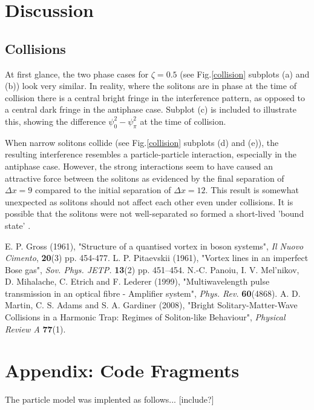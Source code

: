 \documentclass[10pt, twocolumn]{revtex4}    %
\begin{document}

\section{Discussion} 

\subsection{Collisions}

At first glance, the two phase cases for $\zeta=0.5$ (see Fig.\ref{collision} subplots (a) and (b)) look very similar. In reality, where the solitons are in phase at the time of collision there is a central bright fringe in the interference pattern, as opposed to a central dark fringe in the antiphase case. Subplot (c) is included to illustrate this, showing the difference $\psi_0^2 - \psi_{\pi}^2$ at the time of collision. 

When narrow solitons collide (see Fig.\ref{collision} subplots (d) and (e)), the resulting interference resembles a particle-particle interaction, especially in the antiphase case. However, the strong interactions seem to have caused an attractive force between the solitons as evidenced by the final separation of $\Delta x = 9$ compared to the initial separation of $\Delta x=12$. This result is somewhat unexpected as solitons should not affect each other even under collisions. It is possible that the solitons were not well-separated so formed a short-lived 'bound state' \cite{Bound}.


\begin{thebibliography}{}

 E. P. Gross (1961), "Structure of a quantised vortex in boson systems", \textit{Il Nuovo Cimento}, \textbf{20}(3) pp. 454-477. 
  L. P. Pitaevskii (1961), "Vortex lines in an imperfect Bose gas", \textit{Sov. Phys. JETP.} \textbf{13}(2) pp. 451–454.
 N.-C. Panoiu, I. V. Mel’nikov, D. Mihalache, C. Etrich and F. Lederer (1999), "Multiwavelength pulse transmission in an optical fibre - Amplifier system", \textit{Phys. Rev.} \textbf{60}(4868). %
 A. D. Martin, C. S. Adams and S. A. Gardiner (2008), "Bright Solitary-Matter-Wave Collisions in a Harmonic Trap: Regimes of Soliton-like Behaviour", \textit{Physical Review A} \textbf{77}(1). %

\end{thebibliography} 


\section{Appendix: Code Fragments} \label{Appendix}

The particle model was implented as follows... [include?]
\end{document}
